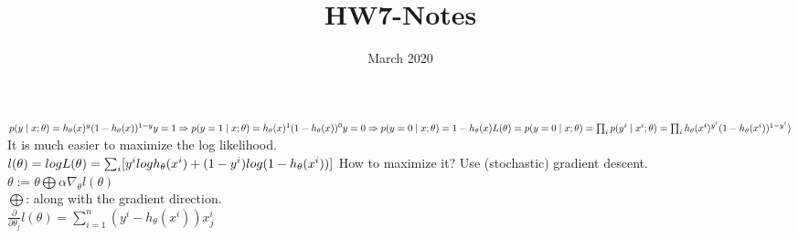 \documentclass{article}
\title{HW7-Notes}
\date{March 2020}
\begin{document}
\begin{Large}
\maketitle
$p(y\mid x; \theta)=h_\theta(x)^y(1-h_\theta(x))^{1-y}\\
y=1\Rightarrow p(y=1\mid x; \theta)=h_\theta(x)^1(1-h_\theta(x))^{0}\\
y=0\Rightarrow p(y=0\mid x; \theta)=1-h_\theta(x)\\
L(\theta)=p(y=0\mid x; \theta)=\prod_{i} p(y^{i}\mid x^{i}; \theta)=\prod_{i} h_\theta(x^{i})^{y^{i}}(1-h_\theta(x^{i}))^{1-y^{i}})$\\
It is much easier to maximize the log likelihood.\\
$l(\theta)=log L(\theta)=\sum_{i} [y^{i}log h_\theta(x^{i})+(1-y^{i})log (1-h_\theta(x^{i}))]\\$
How to maximize it? Use (stochastic) gradient descent.\\
$\theta:=\theta\bigoplus\alpha\nabla_\theta l(\theta)$\\
$\bigoplus$: along with the gradient direction.\\
$\frac{\partial }{\partial \theta_j} l(\theta) = \sum_{i=1}^{n} (y^{i}-h_\theta(x^{i}))x_j^{i} $

\end{Large}
\end{document}
